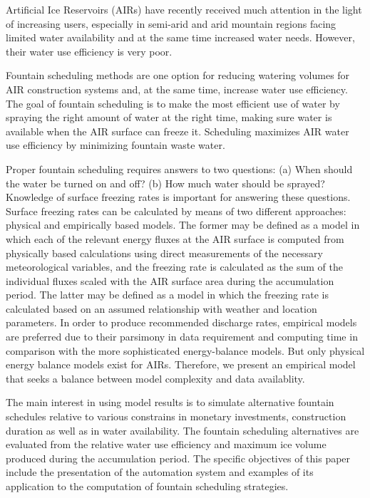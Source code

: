 \documentclass[tc, manuscript]{copernicus}
\begin{document}
\introduction

Artificial Ice Reservoirs (AIRs) have recently received much attention in the light of increasing users,
especially in semi-arid and arid mountain regions facing limited water availability and at the same time
increased water needs. However, their water use efficiency is very poor. 

Fountain scheduling methods are one option for reducing watering volumes for AIR construction systems and, at
the same time, increase water use efficiency. The goal of fountain scheduling is to make the most efficient use of water by
spraying the right amount of water at the right time, making sure water is available when the AIR surface can
freeze it. Scheduling maximizes AIR water use efficiency by minimizing fountain waste water.  

Proper fountain scheduling requires answers to two questions: (a) When should the water be turned on and off?
(b) How much water should be sprayed? Knowledge of surface freezing rates is important for answering these
questions. Surface freezing rates can be calculated by means of two different approaches: physical
and empirically based models. The former may be defined as a model in which each of the relevant
energy fluxes at the AIR surface is computed from physically based calculations using direct measurements of the
necessary meteorological variables, and the freezing rate is calculated as the sum of the individual fluxes
scaled with the AIR surface area during the accumulation period. The latter may be defined as a model in which
the freezing rate is calculated based on an assumed relationship with weather and location parameters. In order
to produce recommended discharge rates, empirical models are preferred due to their parsimony in data
requirement and computing time in comparison with the more sophisticated energy-balance models. But only
physical energy balance models exist for AIRs. Therefore, we present an empirical model that seeks a balance
between model complexity and data availablity.

The main interest in using model results is to simulate alternative fountain schedules relative to various
constrains in monetary investments, construction duration as well as in water availability. The fountain
scheduling alternatives are evaluated from the relative water use efficiency and maximum ice volume produced
during the accumulation period. The specific objectives of this paper include the presentation of the automation
system and examples of its application to the computation of fountain scheduling strategies.
\end{document}
